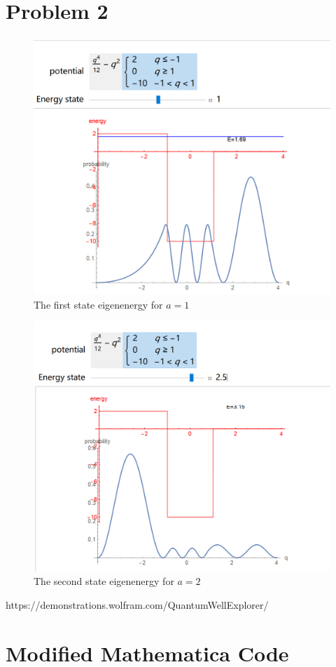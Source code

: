 \documentclass[a4paper]{article}
\begin{document}
\section{Problem 2}
    \begin{figure}[H]
        \centering
        \includegraphics[scale=0.2]{P3.png}
        \caption{The first state eigenenergy for $a=1$}
    \end{figure}
    \begin{figure}[H]
        \centering
        \includegraphics[scale=0.3]{P4.png}
        \caption{The second state eigenenergy for $a=2$}
    \end{figure}
    \begin{thebibliography}{99}
        https://demonstrations.wolfram.com/QuantumWellExplorer/
    \end{thebibliography}
\section*{Modified Mathematica Code}

\end{document}
